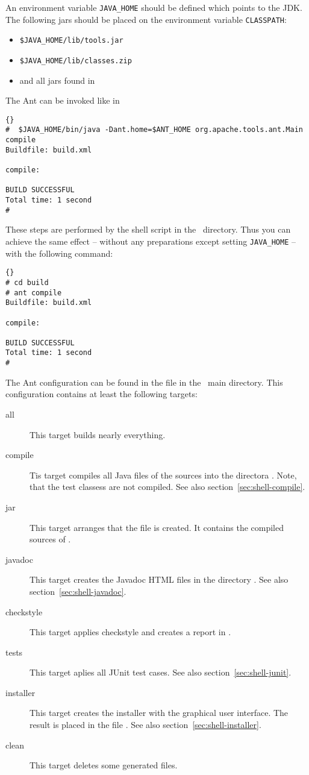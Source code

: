 An environment variable \verb|JAVA_HOME| should be defined which points
to the JDK. The following jars should be placed on the environment
variable \verb|CLASSPATH|:
\begin{itemize}
\item \verb|$JAVA_HOME/lib/tools.jar|
\item \verb|$JAVA_HOME/lib/classes.zip|
\item and all jars found in 
\end{itemize}

The Ant can be invoked like in

\begin{lstlisting}{}
#  $JAVA_HOME/bin/java -Dant.home=$ANT_HOME org.apache.tools.ant.Main compile
Buildfile: build.xml

compile:

BUILD SUCCESSFUL
Total time: 1 second
#
\end{lstlisting}

These steps are performed by the shell script  in the
\ExTeX\ directory. Thus you can achieve the same effect -- without any
preparations except setting \verb|JAVA_HOME| -- with the following command:

\begin{lstlisting}{}
# cd build
# ant compile
Buildfile: build.xml

compile:

BUILD SUCCESSFUL
Total time: 1 second
#
\end{lstlisting}

The Ant configuration can be found in the file  in the
\ExTeX\ main directory. This configuration contains at least the
following targets:

\begin{description}
\item [all] This target builds nearly everything.
\item [compile] Tis target compiles all Java files of the sources into
  the directora . Note, that the test classess
  are not compiled. See also section~\ref{sec:shell-compile}.
\item [jar] This target arranges that the file 
  is created. It contains the compiled sources of  \ExTeX.
\item [javadoc] This target creates the Javadoc HTML files in the
  directory . See also section~\ref{sec:shell-javadoc}.
\item [checkstyle] This target applies checkstyle and creates a report
  in .
\item [tests] This target aplies all JUnit test cases. See also
  section~\ref{sec:shell-junit}.
\item [installer] This target creates the installer with the graphical
  user interface. The result is placed in the file
  . See also section~\ref{sec:shell-installer}.
\item [clean] This target deletes some generated files.
\end{description}


